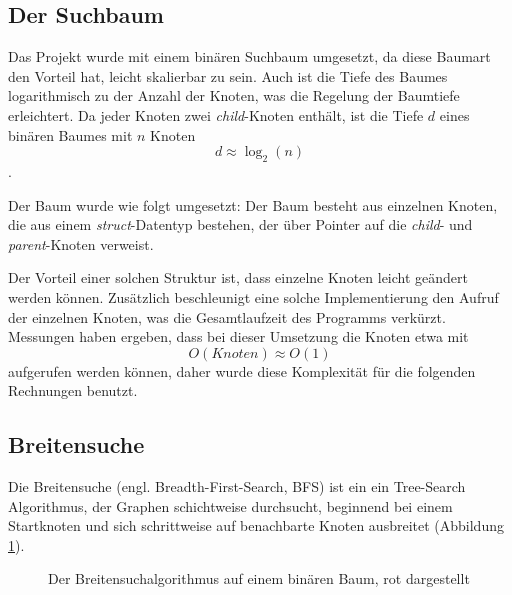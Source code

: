 \documentclass[a4paper,11pt]{article}
\begin{document}
\subsection{Der Suchbaum}
Das Projekt wurde mit einem binären Suchbaum umgesetzt, da diese Baumart den Vorteil hat, leicht skalierbar zu sein. Auch ist die Tiefe des Baumes logarithmisch zu der Anzahl der Knoten, was die Regelung der Baumtiefe erleichtert. Da jeder Knoten zwei \emph{child}-Knoten enthält, ist die Tiefe $d$ eines binären Baumes mit $n$ Knoten $$d \approx \log_2(n)$$ \cite{c2_algorithms}. %

Der Baum wurde wie folgt umgesetzt: Der Baum besteht aus einzelnen Knoten, die aus einem \emph{struct}-Datentyp bestehen, der über Pointer auf die \emph{child}- und \emph{parent}-Knoten verweist.



Der Vorteil einer solchen Struktur ist, dass einzelne Knoten leicht geändert werden können. Zusätzlich beschleunigt eine solche Implementierung den Aufruf der einzelnen Knoten, was die Gesamtlaufzeit des Programms verkürzt. Messungen haben ergeben, dass bei dieser Umsetzung die Knoten etwa mit $$O(Knoten) \approx O(1)$$ aufgerufen werden können, daher wurde diese Komplexität für die folgenden Rechnungen benutzt.


\subsection{Breitensuche}

Die Breitensuche (engl. Breadth-First-Search, BFS) ist ein ein Tree-Search Algorithmus, der Graphen schichtweise durchsucht, beginnend bei einem Startknoten und sich schrittweise auf benachbarte Knoten ausbreitet (Abbildung \ref{fig:binary_tree_bfs}).

\begin{figure}[htbp]
\centering
{}
\caption{Der Breitensuchalgorithmus auf einem binären Baum, rot dargestellt}
\label{fig:binary_tree_bfs}
\end{figure}
\end{document}
